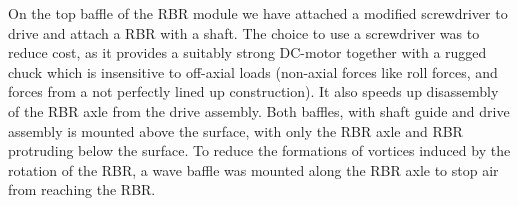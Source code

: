 On the top baffle of the RBR module we have attached a modified screwdriver to drive and attach a RBR with a shaft. The choice to use a screwdriver was to reduce cost, as it provides a suitably strong DC-motor together with a rugged chuck which is insensitive to off-axial loads (non-axial forces like roll forces, and forces from a not perfectly lined up construction). It also speeds up disassembly of the RBR axle from the drive assembly. Both baffles, with shaft guide and drive assembly is mounted above the surface, with only the RBR axle and RBR protruding below the surface. To reduce the formations of vortices induced by the rotation of the RBR, a wave baffle was mounted along the RBR axle to stop air from reaching the RBR.

